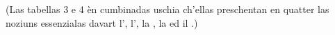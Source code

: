 %
%
%
%
%
%

\VUsaut{3.0mm}
\VUsaut{1.6mm}
\VUsaut{3.4mm}

(Las tabellas 3 e 4 èn cumbinadas uschia ch'ellas preschentan en quatter
 las noziuns essenzialas davart l',
l', la , la  ed il .)

